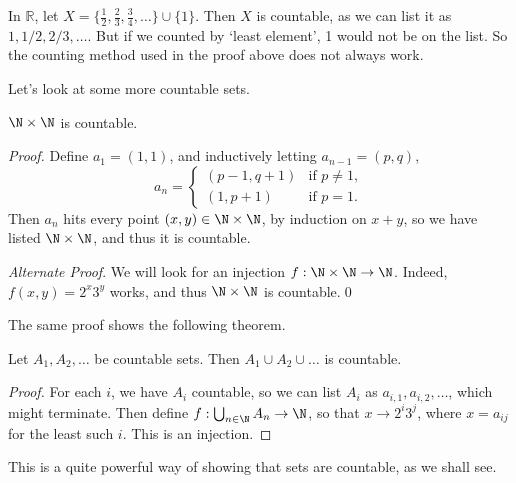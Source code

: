 \documentclass[a4paper]{scrartcl}
\begin{document}
\begin{remark}[A Warning]
	In $\mathbb{R}$, let $X = \{\frac{1}{2}, \frac{2}{3}, \frac{3}{4}, \dots \} \cup \{1\}$. Then $X$ is countable, as we can list it as $1, 1/2, 2/3, \dots$. But if we counted by `least element', 1 would not be on the list. So the counting method used in the proof above does not always work.
\end{remark}

Let's look at some more countable sets.

\begin{theorem}
	$\N \times \N$ is countable.
\end{theorem}
\begin{proof}
	Define $a_1 = (1, 1)$, and inductively letting $a_{n - 1} = (p, q)$, 
	$$
a_n = \begin{cases}
	(p - 1, q + 1) &\mbox{if } p \neq 1, \\
	(1, p + 1) &\mbox{if } p = 1.
   \end{cases}
	$$
	Then $a_n$ hits every point $(x, y) \in \N \times \N$, by induction on $x + y$, so we have listed $\N \times \N$, and thus it is countable. \qedhere
	
	\emph{Alternate Proof}. We will look for an injection $f : \N \times \N \rightarrow \N$. Indeed, $f(x, y) = 2^x 3^y$ works, and thus $\N \times \N$ is countable.\hfill \qed
\end{proof}

The same proof shows the following theorem.

\begin{theorem}
	Let $A_1, A_2, \dots$ be countable sets. Then $A_1 \cup A_2 \cup \dots$ is countable.
\end{theorem}
\begin{proof}
	For each $i$, we have $A_i$ countable, so we can list $A_i$ as $a_{i, 1}, a_{i, 2}, \dots$, which might terminate.
	Then define $f : \bigcup_{n \in \N} A_n \rightarrow \N$, so that $x \rightarrow 2^i 3^j$, where $x = a_{ij}$ for the least such $i$.
This is an injection.
\end{proof}

This is a quite powerful way of showing that sets are countable, as we shall see.
\end{document}

